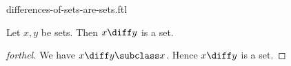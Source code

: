 \documentclass{stex}
\begin{document}
\begin{smodule}{differences-of-sets-are-sets.ftl}


\begin{proposition}[forthel,id=DiffsOfSetsAreSetsProp]
  Let $x, y$ be sets.
  Then $x \diff y$ is a set.
\end{proposition}
\begin{proof}[forthel]
  We have $x \diff y \subclass x$.
  Hence $x \diff y$ is a set.
\end{proof}

\end{smodule}
\end{document}
